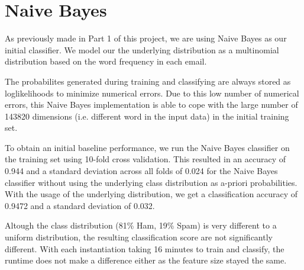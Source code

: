 \section{Naive Bayes}
As previously made in Part 1 of this project, we are using Naive Bayes as our initial classifier.
We model our the underlying distribution as a multinomial distribution based on the word frequency in each email.

The probabilites generated during training and classifying are always stored as loglikelihoods to minimize numerical errors.
Due to this low number of numerical errors, this Naive Bayes implementation is able to cope with the large number of 143820 dimensions (i.e. different word in the input data) in the initial training set.

To obtain an initial baseline performance, we run the Naive Bayes classifier on the training set using 10-fold cross validation.
This resulted in an accuracy of 0.944 and a standard deviation across all folds of 0.024 for the Naive Bayes classifier without using the underlying class distribution as a-priori probabilities.
With the usage of the underlying distribution, we get a classification accuracy of 0.9472 and a standard deviation of 0.032.

Altough the class distribution (81\% Ham, 19\% Spam) is very different to a uniform distribution, the resulting classification score are not significantly different.
With each instantiation taking 16 minutes to train and classify, the runtime does not make a difference either as the feature size stayed the same.


